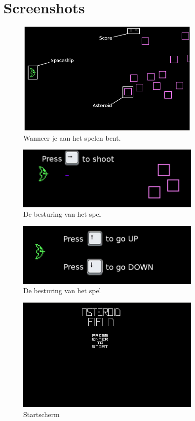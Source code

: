 \documentclass{article}
\begin{document}
\section{Screenshots}\label{screens}
\begin{figure}[htbp]
\includegraphics[width=90mm]{In_Game.jpg}
\caption{Wanneer je aan het spelen bent.}
\label{fig:ingame}
\end{figure}

\begin{figure}[htbp]
\includegraphics[width=90mm]{PressToShoot.jpg}
\caption{De besturing van het spel}
\label{fig:shoot}
\end{figure}

\begin{figure}[htbp]
\includegraphics[width=90mm]{Up_Down.jpg}
\caption{De besturing van het spel}
\label{fig:besturing}
\end{figure}

\begin{figure}[htbp]
\includegraphics[width=90mm]{Menu.jpg}
\caption{Startscherm}
\label{fig:menu}
\end{figure}
\end{document}
